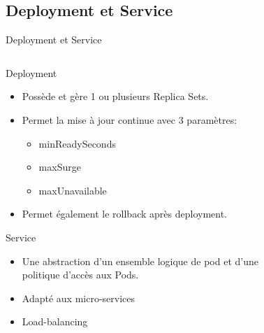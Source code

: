 \documentclass{bredelebeamer}
\begin{document}
\subsection{Deployment et Service}
\begin{frame}{Deployment et Service}
\begin{columns}
\begin{column}{0.6\textwidth}
\begin{block}{Deployment}
\begin{itemize}
	\item Possède et gère 1 ou plusieurs Replica Sets.
	\item Permet la mise à jour continue avec 3 paramètres: 
	\begin{itemize}
	\item minReadySeconds %
	\item maxSurge %
	\item maxUnavailable%
	\end{itemize}
	\item Permet également le rollback après deployment.
\end{itemize}
\end{block}
\begin{exampleblock}{Service}
\begin{itemize}
\item Une abstraction d'un ensemble logique de pod et d'une politique d'accès aux Pods.
\item Adapté aux micro-services
\item Load-balancing
\end{itemize}
\end{exampleblock}
\end{column}
\begin{column}{0.4\textwidth}
\begin{figure}
\centering

\end{figure}
\end{column}
\end{columns}
\end{frame}
\end{document}

